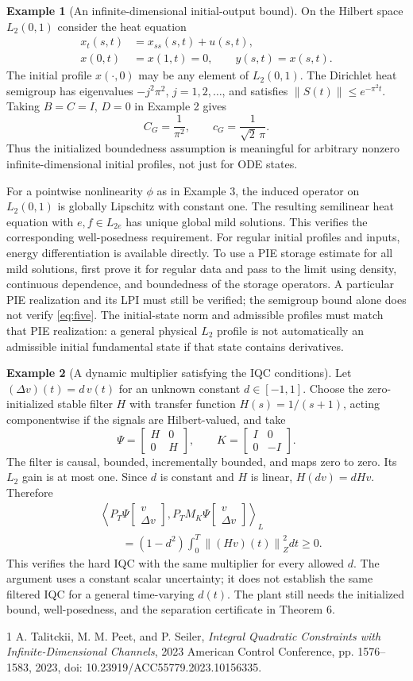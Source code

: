 \documentclass[10pt,twocolumn,letterpaper]{article}
\theoremstyle{definition}
\newtheorem{example}{Example}
\theoremstyle{plain}
\newcommand{\col}[1]{\begin{bmatrix}#1\end{bmatrix}}
\newcommand{\ip}[2]{\left\langle #1,#2\right\rangle}
\newcommand{\norm}[1]{\left\lVert #1\right\rVert}
\begin{document}
\begin{example}[An infinite-dimensional initial-output bound]
On the Hilbert space $L_2(0,1)$ consider the heat equation
\begin{align*}
 x_t(s,t)&=x_{ss}(s,t)+u(s,t),\\
 x(0,t)&=x(1,t)=0,\qquad y(s,t)=x(s,t).
\end{align*}
The initial profile $x(\cdot,0)$ may be any element of $L_2(0,1)$.
The Dirichlet heat semigroup has eigenvalues $-j^2\pi^2$,
$j=1,2,\ldots$, and satisfies $\norm{S(t)}\leq e^{-\pi^2t}$.
Taking $B=C=I$, $D=0$ in Example 2 gives
\[
 C_G=\frac{1}{\pi^2},\qquad
 c_G=\frac{1}{\sqrt{2}\,\pi}.
\]
Thus the initialized boundedness assumption is meaningful for arbitrary
nonzero infinite-dimensional initial profiles, not just for ODE states.

For a pointwise nonlinearity $\phi$ as in Example 3, the induced operator
on $L_2(0,1)$ is globally Lipschitz with constant one. The resulting
semilinear heat equation with $e,f\in L_{2e}$ has unique global mild
solutions. This verifies the corresponding well-posedness requirement.
For regular initial profiles and inputs, energy differentiation is
available directly. To use a PIE storage estimate for all mild
solutions, first prove it for regular data and pass to the limit using
density, continuous dependence, and boundedness of the storage
operators. A particular PIE realization and its LPI must still be
verified; the semigroup bound alone does not verify \eqref{eq:five}.
The initial-state norm and admissible profiles must match that PIE
realization: a general physical $L_2$ profile is not automatically an
admissible initial fundamental state if that state contains derivatives.
\end{example}

\begin{example}[A dynamic multiplier satisfying the IQC conditions]
Let $(\Delta v)(t)=d\,v(t)$ for an unknown constant $d\in[-1,1]$.
Choose the zero-initialized stable filter $H$ with transfer function
$H(s)=1/(s+1)$, acting componentwise if the signals are Hilbert-valued,
and take
\[
 \Psi=\col{H&0\\0&H},\qquad
 K=\col{I&0\\0&-I}.
\]
The filter is causal, bounded, incrementally bounded, and maps zero to
zero. Its $L_2$ gain is at most one. Since $d$ is constant and $H$ is
linear, $H(dv)=dHv$. Therefore
\begin{align*}
 &\ip{P_T\Psi\col{v\\\Delta v}}{
          P_TM_K\Psi\col{v\\\Delta v}}_L\\
 &\qquad=(1-d^2)\int_0^T\norm{(Hv)(t)}_Z^2dt\geq0.
\end{align*}
This verifies the hard IQC with the same multiplier for every allowed
$d$. The argument uses a constant scalar uncertainty; it does not
establish the same filtered IQC for a general time-varying $d(t)$.
The plant still needs the initialized bound, well-posedness, and the
separation certificate in Theorem 6.
\end{example}

\begin{thebibliography}{1}
A. Talitckii, M. M. Peet, and P. Seiler,
\emph{Integral Quadratic Constraints with Infinite-Dimensional Channels},
2023 American Control Conference, pp. 1576--1583, 2023,
doi: 10.23919/ACC55779.2023.10156335.
\end{thebibliography}
\end{document}
